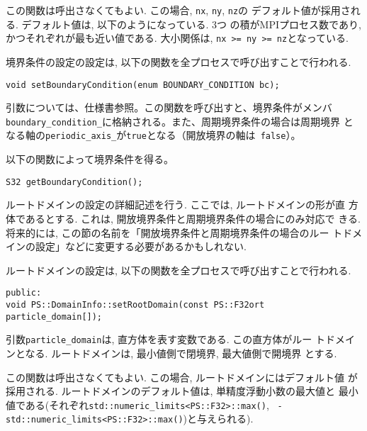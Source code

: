 この関数は呼出さなくてもよい. この場合, {\tt nx}, {\tt ny}, {\tt nz}の
デフォルト値が採用される. デフォルト値は, 以下のようになっている.  3つ
の積がMPIプロセス数であり, かつそれぞれが最も近い値である. 大小関係は,
{\tt nx >= ny >= nz}となっている.


境界条件の設定の設定は, 以下の関数を全プロセスで呼び出すことで行われる.
\begin{screen}
\begin{verbatim}
void setBoundaryCondition(enum BOUNDARY_CONDITION bc);
\end{verbatim}
\end{screen}

引数については、仕様書参照。この関数を呼び出すと、境界条件がメンバ{\tt
boundary\_condition\_}に格納される。また、周期境界条件の場合は周期境界
となる軸の{\tt periodic\_axis\_}が{\tt true}となる（開放境界の軸は{\tt
false}）。

以下の関数によって境界条件を得る。
\begin{screen}
\begin{verbatim}
S32 getBoundaryCondition();
\end{verbatim}
\end{screen}


ルートドメインの設定の詳細記述を行う. ここでは, ルートドメインの形が直
方体であるとする. これは, 開放境界条件と周期境界条件の場合にのみ対応で
きる. 将来的には, この節の名前を「開放境界条件と周期境界条件の場合のルー
トドメインの設定」などに変更する必要があるかもしれない.

ルートドメインの設定は, 以下の関数を全プロセスで呼び出すことで行われる.
\begin{screen}
\begin{verbatim}
public:
void PS::DomainInfo::setRootDomain(const PS::F32ort particle_domain[]);
\end{verbatim}
\end{screen}

引数{\tt particle\_domain}は, 直方体を表す変数である. この直方体がルー
トドメインとなる. ルートドメインは, 最小値側で閉境界, 最大値側で開境界
とする. 

この関数は呼出さなくてもよい. この場合, ルートドメインにはデフォルト値
が採用される.  ルートドメインのデフォルト値は, 単精度浮動小数の最大値と
最小値である(それぞれ{\tt std::numeric\_limits<PS::F32>::max()}, {\tt
- std::numeric\_limits<PS::F32>::max()})と与えられる).

